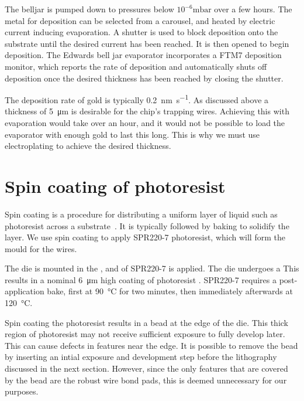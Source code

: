 The belljar is pumped down to pressures below $10^{-6}\si{\milli\bar}$ over a
few hours. The metal for deposition can be selected from a carousel, and heated
by electric current inducing evaporation.  A shutter is used to block
deposition onto the substrate until the desired current has been reached. It is
then opened to begin deposition.
The Edwards bell jar evaporator incorporates a FTM7 deposition monitor, which
reports the rate of deposition and automatically shuts off deposition once the
desired thickness has been reached by closing the shutter. 

The deposition rate of gold is typically \SI{0.2}{\nano\meter\per\second}.
%
%
As discussed above a thickness of \SI{5}{\micro\meter} is desirable for the
chip's trapping wires. Achieving this with evaporation would take over an hour,
and it would not be possible to load the evaporator with enough gold to last
this long. This is why we must use electroplating to achieve the desired
thickness.

\section{Spin coating of photoresist}
\label{fab:spin}

Spin coating is a procedure for distributing a uniform layer of liquid such as
photoresist  across a substrate~\cite{Cohen2011}. It is typically followed by
baking to solidify the layer. We use spin coating to apply SPR220-7 \cite{}
photoresist, which will form the mould for the wires.

The die is mounted in the , and  of SPR220-7 is applied. The die undergoes a
 This results in a
nominal \SI{6}{\micro\meter} high coating of photoresist .
SPR220-7 requires a post-application bake, first at \SI{90}{\celsius} for two
minutes, then immediately afterwards at \SI{120}{\celsius}.

Spin coating the photoresist results in a bead at the edge of the die. This
thick region of photoresist may not receive sufficient exposure to fully
develop later. This can cause defects in features near the edge. It is
possible to remove the bead by inserting an intial exposure and development
step before the lithography discussed in the next section. However, since the
only features that are covered by the bead are the robust wire bond pads, this
is deemed unnecessary for our purposes. 

